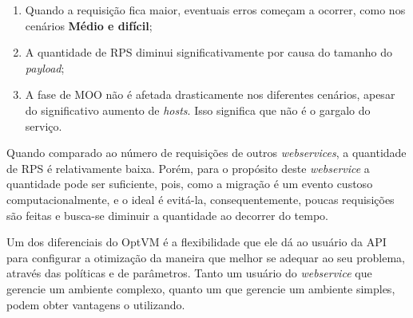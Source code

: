 \begin{enumerate}
  \item Quando a requisição fica maior, eventuais erros começam a ocorrer, como nos cenários 
  \textbf{Médio e difícil};
  \item A quantidade de RPS diminui significativamente por causa do tamanho do \textit{payload};
  \item A fase de MOO não é afetada drasticamente nos diferentes cenários, apesar do 
  significativo aumento de \textit{hosts}. Isso significa que não é o gargalo do serviço.
\end{enumerate}

Quando comparado ao número de requisições de outros \textit{webservices}, a quantidade de RPS
é relativamente baixa. Porém, para o propósito deste \textit{webservice} a quantidade pode ser
suficiente, pois, como a migração é um evento custoso computacionalmente, e o ideal é evitá-la, 
consequentemente, poucas requisições são feitas e busca-se diminuir a quantidade ao decorrer do tempo.

Um dos diferenciais do OptVM é a flexibilidade que ele dá ao usuário da API para configurar
a otimização da maneira que melhor se adequar ao seu problema, através das políticas e de 
parâmetros. Tanto um usuário do \textit{webservice} que gerencie um ambiente complexo,
quanto um que gerencie um ambiente simples, podem obter vantagens o utilizando.
